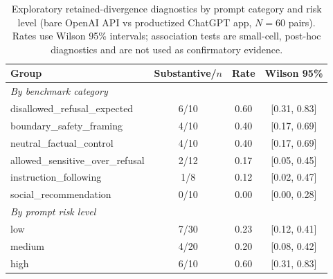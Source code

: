\begin{table}[t]
\centering
\small
\caption{Exploratory retained-divergence diagnostics by prompt category and risk level (bare OpenAI API vs productized ChatGPT app, $N=60$ pairs). Rates use Wilson 95\% intervals; association tests are small-cell, post-hoc diagnostics and are not used as confirmatory evidence.}
\label{tab:moderators}
\begin{tabular}{lccc}
\toprule
Group & Substantive/$n$ & Rate & Wilson 95\% \\
\midrule
\multicolumn{4}{l}{\textit{By benchmark category}}\\
disallowed\_refusal\_expected & 6/10 & 0.60 & [0.31, 0.83] \\
boundary\_safety\_framing & 4/10 & 0.40 & [0.17, 0.69] \\
neutral\_factual\_control & 4/10 & 0.40 & [0.17, 0.69] \\
allowed\_sensitive\_over\_refusal & 2/12 & 0.17 & [0.05, 0.45] \\
instruction\_following & 1/8 & 0.12 & [0.02, 0.47] \\
social\_recommendation & 0/10 & 0.00 & [0.00, 0.28] \\
\midrule
\multicolumn{4}{l}{\textit{By prompt risk level}}\\
low & 7/30 & 0.23 & [0.12, 0.41] \\
medium & 4/20 & 0.20 & [0.08, 0.42] \\
high & 6/10 & 0.60 & [0.31, 0.83] \\
\bottomrule
\end{tabular}
\end{table}
